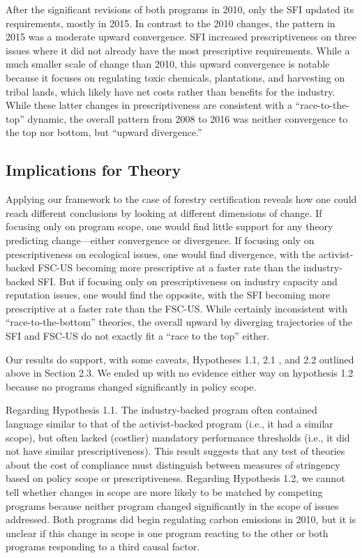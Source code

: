 \documentclass[
      12pt,
            Review ]{article}
\begin{document}
After the significant revisions of both programs in 2010, only the SFI updated its requirements, mostly in 2015. In contrast to the 2010 changes, the pattern in 2015 was a moderate upward convergence. SFI increased prescriptiveness on three issues where it did not already have the most prescriptive requirements. While a much smaller scale of change than 2010, this upward convergence is notable because it focuses on regulating toxic chemicals, plantations, and harvesting on tribal lands, which likely have net costs rather than benefits for the industry. While these latter changes in prescriptiveness are consistent with a ``race-to-the-top'' dynamic, the overall pattern from 2008 to 2016 was neither convergence to the top nor bottom, but ``upward divergence.''

\hypertarget{implications-for-theory}{%
\subsection{Implications for Theory}\label{implications-for-theory}}

Applying our framework to the case of forestry certification reveals how one could reach different conclusions by looking at different dimensions of change. If focusing only on program scope, one would find little support for any theory predicting change---either convergence or divergence. If focusing only on prescriptiveness on ecological issues, one would find divergence, with the activist-backed FSC-US becoming more prescriptive at a faster rate than the industry-backed SFI. But if focusing only on prescriptiveness on industry capacity and reputation issues, one would find the opposite, with the SFI becoming more prescriptive at a faster rate than the FSC-US. While certainly inconsistent with ``race-to-the-bottom'' theories, the overall upward by diverging trajectories of the SFI and FSC-US do not exactly fit a ``race to the top'' either.

Our results do support, with some caveats, Hypotheses 1.1, 2.1 , and 2.2 outlined above in Section 2.3. We ended up with no evidence either way on hypothesis 1.2 because no programs changed significantly in policy scope.

Regarding Hypothesis 1.1. The industry-backed program often contained language similar to that of the activist-backed program (i.e., it had a similar scope), but often lacked (costlier) mandatory performance thresholds (i.e., it did not have similar prescriptiveness). This result suggests that any test of theories about the cost of compliance must distinguish between measures of stringency based on policy scope or prescriptiveness. Regarding Hypothesis 1.2, we cannot tell whether changes in scope are more likely to be matched by competing programs because neither program changed significantly in the scope of issues addressed. Both programs did begin regulating carbon emissions in 2010, but it is unclear if this change in scope is one program reacting to the other or both programs responding to a third causal factor.
\end{document}
